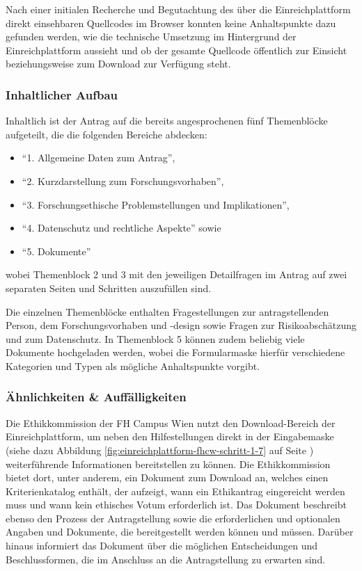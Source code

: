 \documentclass[a4paper,12pt,twoside,numbers=noendperiod]{scrreprt}
\begin{document}
\medskip

Nach einer initialen Recherche und Begutachtung des über die Einreichplattform direkt einsehbaren Quellcodes im Browser konnten keine Anhaltspunkte dazu gefunden werden, wie die technische Umsetzung im Hintergrund der Einreichplattform aussieht und ob der gesamte Quellcode öffentlich zur Einsicht beziehungsweise zum Download zur Verfügung steht.

\subsubsection*{Inhaltlicher Aufbau}
\label{sub-sub-sec:fhcw-inhaltlicher-aufbau}

Inhaltlich ist der Antrag auf die bereits angesprochenen fünf Themenblöcke aufgeteilt, die die folgenden Bereiche abdecken:
\begin{itemize}
    \item \enquote{1. Allgemeine Daten zum Antrag},
    \item \enquote{2. Kurzdarstellung zum Forschungsvorhaben},
    \item \enquote{3. Forschungsethische Problemstellungen und Implikationen},
    \item \enquote{4. Datenschutz und rechtliche Aspekte} sowie
    \item \enquote{5. Dokumente}
\end{itemize}

\noindent wobei Themenblock 2 und 3 mit den jeweiligen Detailfragen im Antrag auf zwei separaten Seiten und Schritten auszufüllen sind.

Die einzelnen Themenblöcke enthalten Fragestellungen zur antragstellenden Person, dem Forschungsvorhaben und -design sowie Fragen zur Risikoabschätzung und zum Datenschutz. In Themenblock 5 können zudem beliebig viele Dokumente hochgeladen werden, wobei die Formularmaske hierfür verschiedene Kategorien und Typen als mögliche Anhaltspunkte vorgibt.

\subsubsection*{Ähnlichkeiten \& Auffälligkeiten}
\label{sub-sub-sec:ähnlichkeiten-auffälligkeiten-fhcw}

Die Ethikkommission der FH Campus Wien nutzt den Download-Bereich der Einreichplattform, um neben den Hilfestellungen direkt in der Eingabemaske (siehe dazu Abbildung \ref{fig:einreichplattform-fhcw-schritt-1-7} auf Seite \pageref{fig:einreichplattform-fhcw-schritt-1-7}) weiterführende Informationen bereitstellen zu können. Die Ethikkommission bietet dort, unter anderem, ein Dokument zum Download an, welches einen Kriterienkatalog enthält, der aufzeigt, wann ein Ethikantrag eingereicht werden muss und wann kein ethisches Votum erforderlich ist. Das Dokument beschreibt ebenso den Prozess der Antragstellung sowie die erforderlichen und optionalen Angaben und Dokumente, die bereitgestellt werden können und müssen. Darüber hinaus informiert das Dokument über die möglichen Entscheidungen und Beschlussformen, die im Anschluss an die Antragstellung zu erwarten sind. \cite[1\psqq]{ethikkommission_fh_campus_wien_wissenswertes_2022}
\end{document}
